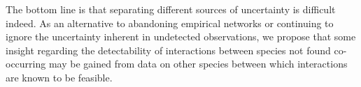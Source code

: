 \documentclass[12pt]{article}
\begin{document}
The bottom line is that separating different sources of uncertainty is difficult indeed. As an alternative to abandoning empirical networks or continuing to ignore the uncertainty inherent in undetected observations, we propose that some insight regarding the detectability of interactions between species not found co-occurring may be gained from data on other species between which interactions are known to be feasible. 


\end{document}
